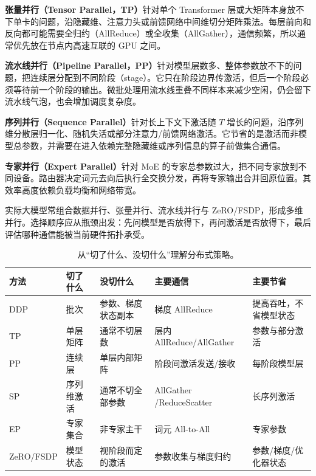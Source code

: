 \textbf{张量并行（Tensor Parallel，TP）}针对单个 Transformer 层或大矩阵本身放不下单卡的问题，沿隐藏维、注意力头或前馈网络中间维切分矩阵乘法。每层前向和反向都可能需要全归约（AllReduce）或全收集（AllGather），通信频繁，所以通常优先放在节点内高速互联的 GPU 之间。

\textbf{流水线并行（Pipeline Parallel，PP）}针对模型层数多、整体参数放不下的问题，把连续层分配到不同阶段（stage）。它只在阶段边界传激活，但后一个阶段必须等待前一个阶段的输出。微批处理用流水线重叠不同样本来减少空闲，仍会留下流水线气泡，也会增加调度复杂度。

\textbf{序列并行（Sequence Parallel）}针对长上下文下激活随 $T$ 增长的问题，沿序列维分散层归一化、随机失活或部分注意力/前馈网络激活。它节省的是激活而非模型总参数，并需要在进入依赖完整隐藏维或序列信息的算子前做集合通信。

\textbf{专家并行（Expert Parallel）}针对 MoE 的专家总参数过大，把不同专家放到不同设备。路由器决定词元去向后执行全交换分发，再将专家输出合并回原位置。其效率高度依赖负载均衡和网络带宽。

实际大模型常组合数据并行、张量并行、流水线并行与 ZeRO/FSDP，形成多维并行。选择顺序应从瓶颈出发：先问模型是否放得下，再问激活是否放得下，最后评估哪种通信能被当前硬件拓扑承受。

\begin{table}[htbp]
\centering
\small
\begin{tabularx}{0.98\textwidth}{lYYYY}
\toprule
方法 & 切了什么 & 没切什么 & 主要通信 & 主要节省\\
\midrule
DDP & 批次 & 参数、梯度状态副本 & 梯度 AllReduce & 提高吞吐，不省模型状态\\
TP & 单层矩阵 & 通常不切层数 & 层内 AllReduce/AllGather & 参数与部分激活\\
PP & 连续层 & 单层内部矩阵 & 阶段间激活发送/接收 & 每阶段模型层\\
SP & 序列维激活 & 通常不切全部参数 & AllGather /\newline ReduceScatter & 长序列激活\\
EP & 专家集合 & 非专家主干 & 词元 All-to-All & 专家参数\\
ZeRO/FSDP & 模型状态 & 视阶段而定的激活 & 参数收集与梯度归约 & 参数/梯度/优化器状态\\
\bottomrule
\end{tabularx}
\caption{从“切了什么、没切什么”理解分布式策略。}
\end{table}

